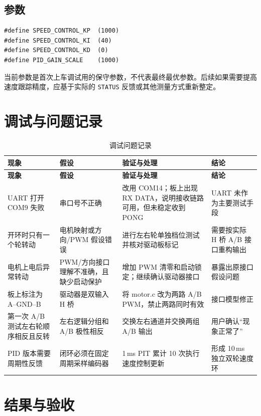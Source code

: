 \documentclass[11pt,a4paper,fontset=fandol]{ctexart}
\begin{document}
\subsection{参数}

\begin{lstlisting}
#define SPEED_CONTROL_KP  (1000)
#define SPEED_CONTROL_KI  (40)
#define SPEED_CONTROL_KD  (0)
#define PID_GAIN_SCALE    (1000)
\end{lstlisting}

当前参数是首次上车调试用的保守参数，不代表最终最优参数。后续如果需要提高速度跟踪精度，应基于实际的 \texttt{STATUS} 反馈或其他测量方式重新整定。

\section{调试与问题记录}

\small
\begin{longtable}{p{}p{}p{}p{}}
\caption{调试问题记录}\\
\toprule
\textbf{现象} & \textbf{假设} & \textbf{验证与处理} & \textbf{结论}\\
\midrule
\endfirsthead
\toprule
\textbf{现象} & \textbf{假设} & \textbf{验证与处理} & \textbf{结论}\\
\midrule
\endhead
UART 打开 COM9 失败 & 串口号不正确 & 改用 COM14；板上出现 RX DATA，说明接收链路可用，但未稳定收到 PONG & UART 未作为主要测试手段\\
开环时只有一个轮转动 & 电机映射或方向/PWM 假设错误 & 进行左右轮单独档位测试并核对驱动板标记 & 需要按实际 H 桥 A/B 接口重构输出\\
电机上电后异常转动 & PWM/方向接口理解不准确，且缺少启动保护 & 增加 PWM 清零和启动锁定；继续确认驱动器接口 & 暴露出原接口假设问题\\
板上标注为 A--GND--B & 驱动器是双输入 H 桥 & 将 motor.c 改为两路 A/B PWM，禁止两路同时有效 & 接口模型修正\\
第一次 A/B 测试左右轮顺序相反且反转 & 左右逻辑分组和 A/B 极性相反 & 交换左右通道并交换两组 A/B 输出 & 用户确认“现象正常了”\\
PID 版本需要周期性反馈 & 闭环必须在固定周期采样编码器 & 1\,ms PIT 累计 10 次执行速度控制更新 & 形成 10\,ms 独立双轮速度环\\
\bottomrule
\end{longtable}
\normalsize

\section{结果与验收}
\end{document}
